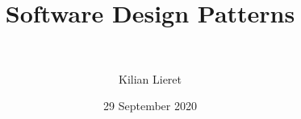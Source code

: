 %
\title{Software Design Patterns}
\subtitle{\ \relax}
\author{Kilian Lieret}
\newcommand*{\coauthors}{}
\date{29 September 2020}
%
%
%